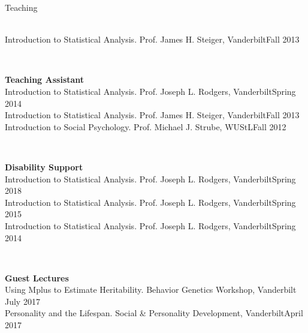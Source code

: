 \begin{rSection}{\textrm{Teaching}}
\begin{minipage}{\linewidth}
\smallskip\\
Introduction to Statistical Analysis. Prof. James H. Steiger, Vanderbilt\hfill{Fall 2013}%
\end{minipage}
\medskip\\
\begin{minipage}{\linewidth}{\large {\bf Teaching Assistant}}\\
Introduction to Statistical Analysis. Prof. Joseph L. Rodgers, Vanderbilt\hfill  {Spring 2014}\smallskip\\
Introduction to Statistical Analysis. Prof. James H. Steiger, Vanderbilt\hfill  {Fall 2013}\smallskip\\
Introduction to Social Psychology. Prof. Michael J. Strube, WUStL\hfill{Fall 2012}\end{minipage}\medskip\\
\begin{minipage}{\linewidth}{\large {\bf Disability Support}}\\
Introduction to Statistical Analysis. Prof. Joseph L. Rodgers, Vanderbilt\hfill  {Spring 2018}\smallskip\\
Introduction to Statistical Analysis. Prof. Joseph L. Rodgers, Vanderbilt\hfill  {Spring 2015}\smallskip\\
Introduction to Statistical Analysis. Prof. Joseph L. Rodgers, Vanderbilt\hfill{Spring 2014}\end{minipage}\medskip\\
\begin{minipage}{\linewidth}{\large {\bf Guest Lectures}}\\
Using Mplus to Estimate Heritability. Behavior Genetics Workshop, Vanderbilt \hfill{July 2017}\\
Personality and the Lifespan. Social \& Personality Development, Vanderbilt\hfill {April 2017}\end{minipage}
\end{rSection}
